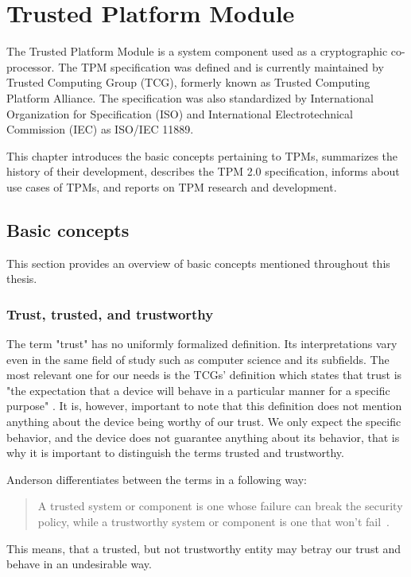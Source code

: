 \chapter{Trusted Platform Module}
The Trusted Platform Module is a system component used as a cryptographic co-processor. The TPM specification was defined and is currently maintained by Trusted Computing Group (TCG), formerly known as Trusted Computing Platform Alliance. The specification was also standardized by International Organization for Specification (ISO) and International Electrotechnical Commission (IEC) as ISO/IEC 11889.

This chapter introduces the basic concepts pertaining to TPMs, summarizes the history of their development, describes the TPM 2.0 specification, informs about use cases of TPMs, and reports on TPM research and development.

\section{Basic concepts}
This section provides an overview of basic concepts mentioned throughout this thesis. 

\subsection{Trust, trusted, and trustworthy}\label{sec:trust-def}
The term "trust" has no uniformly formalized definition. Its interpretations vary even in the same field of study such as computer science and its subfields. The most relevant one for our needs is the TCGs' definition which states that trust is "the expectation that a device will behave in a particular manner for a specific purpose" \cite{tcg_arch_overview}. It is, however, important to note that this definition does not mention anything about the device being worthy of our trust. We only expect the specific behavior, and the device does not guarantee anything about its behavior, that is why it is important to distinguish the terms trusted and trustworthy. 

Anderson differentiates between the terms in a following way:
\begin{quote}
A trusted system or component is one whose failure can break the security policy, while a trustworthy system or component is one that won’t fail~\cite{andersonSecEng}.
\end{quote}

This means, that a trusted, but not trustworthy entity may betray our trust and behave in an undesirable way.

